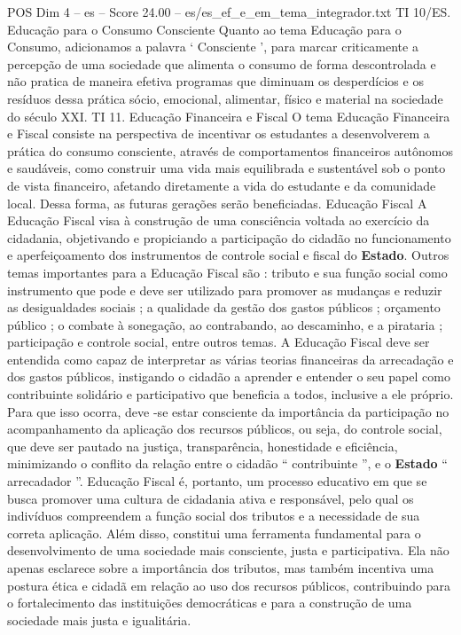 \begin{textsample}{POS Dim 4 – es – Score 24.00 – es/es\_ef\_e\_em\_tema\_integrador.txt}
TI 10/ES.
Educação para o Consumo Consciente Quanto ao tema Educação para o Consumo, adicionamos a palavra ‘ Consciente ’, para marcar criticamente a percepção de uma sociedade que alimenta o consumo de forma descontrolada e não pratica de maneira efetiva programas que diminuam os desperdícios e os resíduos dessa prática sócio, emocional, alimentar, físico e material na sociedade do século XXI.
TI 11.
Educação Financeira e Fiscal O tema Educação Financeira e Fiscal consiste na perspectiva de incentivar os estudantes a desenvolverem a prática do consumo consciente, através de comportamentos financeiros autônomos e saudáveis, como construir uma vida mais equilibrada e sustentável sob o ponto de vista financeiro, afetando diretamente a vida do estudante e da comunidade local.
Dessa forma, as futuras gerações serão beneficiadas.
Educação Fiscal A Educação Fiscal visa à construção de uma consciência voltada ao exercício da cidadania, objetivando e propiciando a participação do cidadão no funcionamento e aperfeiçoamento dos instrumentos de controle social e fiscal do \textbf{Estado}.
Outros temas importantes para a Educação Fiscal são : tributo e sua função social como instrumento que pode e deve ser utilizado para promover as mudanças e reduzir as desigualdades sociais ; a qualidade da gestão dos gastos públicos ; orçamento público ; o combate à sonegação, ao contrabando, ao descaminho, e a pirataria ; participação e controle social, entre outros temas.
A Educação Fiscal deve ser entendida como capaz de interpretar as várias teorias financeiras da arrecadação e dos gastos públicos, instigando o cidadão a aprender e entender o seu papel como contribuinte solidário e participativo que beneficia a todos, inclusive a ele próprio.
Para que isso ocorra, deve -se estar consciente da importância da participação no acompanhamento da aplicação dos recursos públicos, ou seja, do controle social, que deve ser pautado na justiça, transparência, honestidade e eficiência, minimizando o conflito da relação entre o cidadão “ contribuinte ”, e o \textbf{Estado} “ arrecadador ”.
Educação Fiscal é, portanto, um processo educativo em que se busca promover uma cultura de cidadania ativa e responsável, pelo qual os indivíduos compreendem a função social dos tributos e a necessidade de sua correta aplicação.
Além disso, constitui uma ferramenta fundamental para o desenvolvimento de uma sociedade mais consciente, justa e participativa.
Ela não apenas esclarece sobre a importância dos tributos, mas também incentiva uma postura ética e cidadã em relação ao uso dos recursos públicos, contribuindo para o fortalecimento das instituições democráticas e para a construção de uma sociedade mais justa e igualitária.

\end{textsample}
